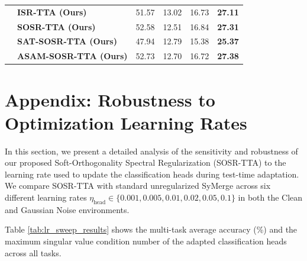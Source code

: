 \documentclass{article}
\theoremstyle{plain}
\theoremstyle{definition}
\theoremstyle{remark}
\begin{document}
\begin{table}[t]
\begin{center}
\begin{small}
\begin{tabular}{llcccc}
 & \quad \textbf{ISR-TTA (Ours)} & 51.57 & 13.02 & 16.73 & \textbf{27.11} \\
 & \quad \textbf{SOSR-TTA (Ours)} & 52.58 & 12.51 & 16.84 & \textbf{27.31} \\
 & \quad \textbf{SAT-SOSR-TTA (Ours)} & 47.94 & 12.79 & 15.38 & \textbf{25.37} \\
 & \quad \textbf{ASAM-SOSR-TTA (Ours)} & 52.73 & 12.70 & 16.72 & \textbf{27.38} \\
\bottomrule
\end{tabular}
\end{small}
\end{center}
\vskip -0.1in
\end{table}

\section{Appendix: Robustness to Optimization Learning Rates}
\label{appendix:lr_robustness}

In this section, we present a detailed analysis of the sensitivity and robustness of our proposed Soft-Orthogonality Spectral Regularization (SOSR-TTA) to the learning rate used to update the classification heads during test-time adaptation. We compare SOSR-TTA with standard unregularized SyMerge across six different learning rates $\eta_{\text{head}} \in \{0.001, 0.005, 0.01, 0.02, 0.05, 0.1\}$ in both the Clean and Gaussian Noise environments.

Table \ref{tab:lr_sweep_results} shows the multi-task average accuracy (\%) and the maximum singular value condition number of the adapted classification heads across all tasks. 
\end{document}
